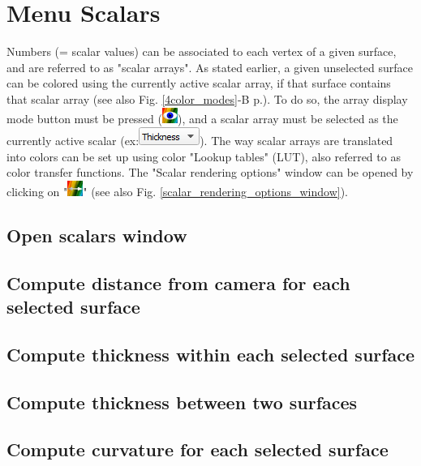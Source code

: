 
\chapter{Menu Scalars}\label{scalars_chapter}
\minitoc 

Numbers (= scalar values) can be associated to each vertex of a given surface, and are referred to as "scalar arrays". 
As stated earlier, a given unselected surface can be colored using the currently active scalar array, if that surface contains that scalar array (see also Fig. \ref{4color_modes}-B p.\pageref{4color_modes}). To do so, the array display mode button must be pressed (\includegraphics[scale=0.7]{images/04/show_color_scale.png}), and a scalar array must be selected as the currently active scalar (ex:\includegraphics[scale=0.5]{images/04/scalarcombo_scalar.png}). The way scalar arrays are translated into colors can be set up using color "Lookup tables" (LUT), also referred to as color transfer functions. The "Scalar rendering options" window can be opened by clicking on "\includegraphics[scale=0.7]{images/04/color_scale_edit.png}" (see also Fig. \ref{scalar_rendering_options_window}).

\section{Open scalars window}
\section{Compute distance from camera for each selected surface}
\section{Compute thickness within each selected surface}
\section{Compute thickness between two surfaces}
\section{Compute curvature for each selected surface}
